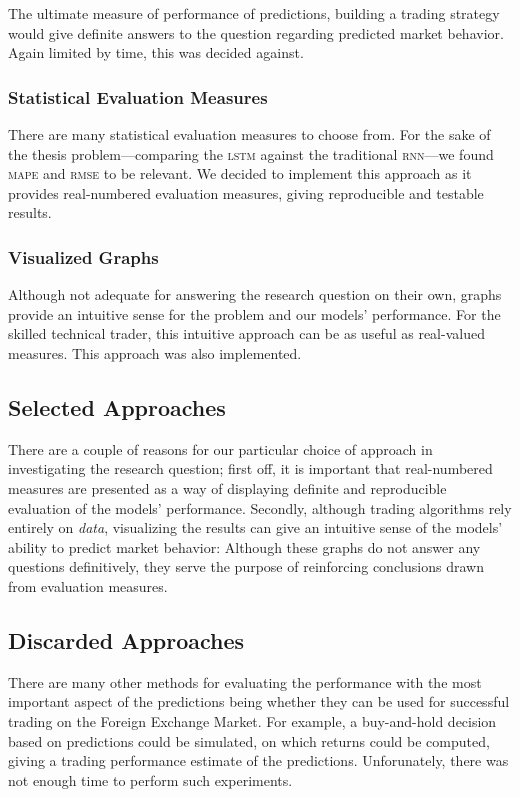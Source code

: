\begin{multicols}{2}
The ultimate measure of performance of predictions, building a trading strategy
would give definite answers to the question regarding predicted market behavior.
Again limited by time, this was decided against.

\subsubsection{Statistical Evaluation Measures}

There are many statistical evaluation measures to choose from.  For the sake of
the thesis problem---comparing the \textsc{lstm} against the traditional
\textsc{rnn}---we found \textsc{mape} and \textsc{rmse} to be relevant.  We
decided to implement this approach as it provides real-numbered evaluation
measures, giving reproducible and testable results.

\subsubsection{Visualized Graphs}

Although not adequate for answering the research question on their own, graphs
provide an intuitive sense for the problem and our models' performance.  For the
skilled technical trader, this intuitive approach can be as useful as
real-valued measures. This approach was also implemented.

\subsection{Selected Approaches}

There are a couple of reasons for our particular choice of approach in
investigating the research question; first off, it is important that
real-numbered measures are presented as a way of displaying definite and
reproducible evaluation of the models' performance.  Secondly, although trading
algorithms rely entirely on \textit{data}, visualizing the results can give an
intuitive sense of the models' ability to predict market behavior: Although
these graphs do not answer any questions definitively, they serve the purpose of
reinforcing conclusions drawn from evaluation measures.

\subsection{Discarded Approaches}

There are many other methods for evaluating the performance with the most
important aspect of the predictions being whether they can be used for
successful trading on the Foreign Exchange Market.  For example, a buy-and-hold
decision based on predictions could be simulated, on which returns could be
computed, giving a trading performance estimate of the predictions.
Unforunately, there was not enough time to perform such experiments.


\end{multicols}
